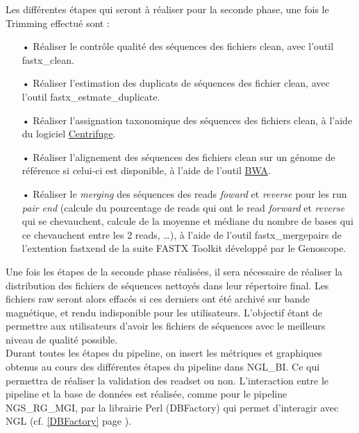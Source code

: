 Les différentes étapes qui seront à réaliser pour la seconde phase, une fois le Trimming effectué sont :\\
\begin{itemize}
    \item[•] Réaliser le contrôle qualité des séquences des fichiers clean, avec l'outil fastx\_clean.
    \item[•] Réaliser l'estimation des duplicats de séquences des fichier clean, avec l'outil fastx\_estmate\_duplicate.
    \item[•] Réaliser l'assignation taxonomique des séquences des fichiers clean, à l'aide du logiciel \href{https://ccb.jhu.edu/software/centrifuge/manual.shtml}{Centrifuge}.
    \item[•] Réaliser l'alignement des séquences des fichiers clean sur un génome de référence si celui-ci est disponible, à l'aide de l'outil \href{http://bio-bwa.sourceforge.net/bwa.shtml}{BWA}.
    \item[•] Réaliser le \og\emph{merging}\fg{} des séquences des reads \emph{foward} et \emph{reverse} pour les run \emph{pair end} (calcule du pourcentage de reads qui ont le read \emph{forward} et \emph{reverse} qui se chevauchent, calcule de la moyenne et médiane du nombre de bases qui ce chevauchent entre les 2 reads, \dots), à l'aide de l'outil fastx\_mergepairs de l'extention fastxend de la suite FASTX Toolkit développé par le Genoscope.\\
\end{itemize}

Une fois les étapes de la seconde phase réalisées, il sera nécessaire de réaliser la distribution des fichiers de séquences nettoyés dans leur répertoire final. Les fichiers raw seront alors effacés si ces derniers ont été archivé sur bande magnétique, et rendu indisponible pour les utilisateurs. L'objectif étant de permettre aux utilisateurs d'avoir les fichiers de séquences avec le meilleurs niveau de qualité possible.\\

Durant toutes les étapes du pipeline, on insert les métriques et graphiques obtenus au cours des différentes étapes du pipeline dans NGL\_BI. Ce qui permettra de réaliser la validation des readset ou non. L'interaction entre le pipeline et la base de données est réalisée, comme pour le pipeline NGS\_RG\_MGI, par la librairie Perl (DBFactory) qui permet d'interagir avec NGL (cf. \ref{DBFactory} page \pageref{DBFactory}).\\

